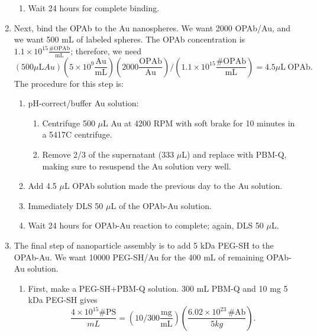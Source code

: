 \begin{enumerate}
\begin{enumerate}
\item Wait 24 hours for complete binding.

\end{enumerate}

\item Next, bind the OPAb to the Au nanospheres. We want 2000 OPAb\slash Au, and we want 500 mL of labeled spheres. The OPAb concentration is $1.1\times10^{15} \mathrm{\frac{\#OPAb}{mL}}$; therefore, we need
\[\left(500 \mu\mathrm{L} Au\right)\left(5\times10^9\mathrm{\frac{Au}{mL}}\right)\left(2000\mathrm{\frac{OPAb}{Au}}\right)/\left(1.1\times10^{15} \mathrm{\frac{\#OPAb}{mL}}\right)=4.5\mu\mathrm{L\ OPAb}.\] The procedure for this step is:

\begin{enumerate}
\item pH-correct\slash buffer Au solution:

\begin{enumerate}
\item Centrifuge 500 $\mu$L Au at 4200 RPM with soft brake for 10 minutes in a 5417C centrifuge.

\item Remove 2\slash 3 of the supernatant (333 $\mu$L) and replace with PBM-Q, making sure to resuspend the Au solution very well.

\end{enumerate}

\item Add 4.5 $\mu$L OPAb solution made the previous day to the Au solution.

\item Immediately DLS 50 $\mu$L of the OPAb-Au solution.

\item Wait 24 hours for OPAb-Au reaction to complete; again, DLS 50 $\mu$L.

\end{enumerate}

\item The final step of nanoparticle assembly is to add 5 kDa PEG-SH to the OPAb-Au. We want 10000 PEG-SH\slash Au for the 400 mL of remaining OPAb-Au solution.

\begin{enumerate}
\item First, make a PEG-SH+PBM-Q solution. 300 mL PBM-Q and 10 mg 5 kDa PEG-SH gives \[\frac{4\times10^{15}\#\mathrm{PS}}{mL}=\left(10/300\mathrm{\frac{mg}{mL}}\right)\left(\frac{6.02\times10^{23}\,\#\mathrm{Ab}}{5 kg}\right).\]


\end{enumerate}
\end{enumerate}

